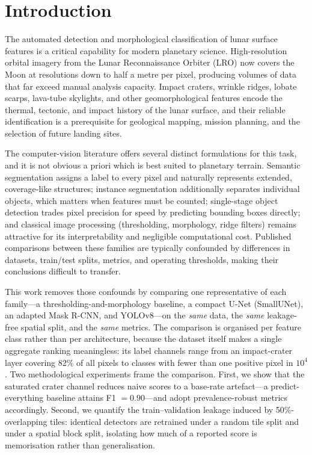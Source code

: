 \section{Introduction}
\label{sec:introduction}

The automated detection and morphological classification of lunar surface features is a critical capability for modern planetary science. High-resolution orbital imagery from the Lunar Reconnaissance Orbiter (LRO) now covers the Moon at resolutions down to half a metre per pixel, producing volumes of data that far exceed manual analysis capacity. Impact craters, wrinkle ridges, lobate scarps, lava-tube skylights, and other geomorphological features encode the thermal, tectonic, and impact history of the lunar surface, and their reliable identification is a prerequisite for geological mapping, mission planning, and the selection of future landing sites.

The computer-vision literature offers several distinct formulations for this task, and it is not obvious a priori which is best suited to planetary terrain. Semantic segmentation assigns a label to every pixel and naturally represents extended, coverage-like structures; instance segmentation additionally separates individual objects, which matters when features must be counted; single-stage object detection trades pixel precision for speed by predicting bounding boxes directly; and classical image processing (thresholding, morphology, ridge filters) remains attractive for its interpretability and negligible computational cost. Published comparisons between these families are typically confounded by differences in datasets, train/test splits, metrics, and operating thresholds, making their conclusions difficult to transfer.

This work removes those confounds by comparing one representative of each family---a thresholding-and-morphology baseline, a compact U-Net (SmallUNet), an adapted Mask R-CNN, and YOLOv8---on the \emph{same} data, the \emph{same} leakage-free spatial split, and the \emph{same} metrics. The comparison is organised per feature class rather than per architecture, because the dataset itself makes a single aggregate ranking meaningless: its label channels range from an impact-crater layer covering 82\% of all pixels to classes with fewer than one positive pixel in $10^{4}$. Two methodological experiments frame the comparison. First, we show that the saturated crater channel reduces naive scores to a base-rate artefact---a predict-everything baseline attains F1 $= 0.90$---and adopt prevalence-robust metrics accordingly. Second, we quantify the train--validation leakage induced by 50\%-overlapping tiles: identical detectors are retrained under a random tile split and under a spatial block split, isolating how much of a reported score is memorisation rather than generalisation.

